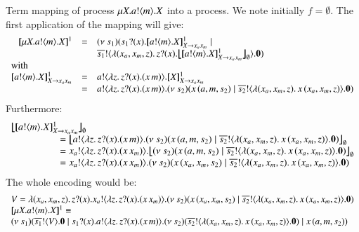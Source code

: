 \begin{example}

 Term mapping of \HOp process $\mu X. a ! \langle m \rangle . X$
into a \HO process. We note initially $f = \emptyset$. The first application of the mapping
will give:
%
\[
\begin{array}{rcl}
	\pmapp{\recp{X}{\bout{a}{m} \varp{X}}}{1}{} &=&
	\newsp{s_1}{ \binp{s_1}{x} \pmapp{\bout{a}{m} \varp{X}}{1}{\varp{X} \rightarrow x_ax_m} \Par\\
	&&\bout{\dual{s_1}}{ \abs{(x_a, x_m, z)} \binp{z}{x} \auxmap{\pmapp{\bout{a}{m} \varp{X}}{1}{\varp{X} \rightarrow x_ax_m}}{\es} } \inact}
	\\
	\multicolumn{3}{l}{\textrm{with}}
	\\
	\pmapp{\bout{a}{m} \varp{X}}{1}{ \varp{X} \rightarrow x_ax_m} &=&
	\bout{a}{\abs{z}{\binp{z}{x} (\appl{x}{m})}} \pmapp{\varp{X}}{1}{\varp{X} \rightarrow x_ax_m}
	\\
	&=& \bout{a}{\abs{z}{\binp{z}{x} (\appl{x}{m})}} \newsp{s_2}{\appl{x}{(a,m, s_2)}  \Par \bout{\dual{s_2}}{\abs{(x_a, x_m, z)}{\appl{x}{(x_a, x_m, z)}}} \inact}
\end{array}
\]
%
\noi Furthermore:
%
\[
\begin{array}{l}
	\auxmap{\pmapp{\bout{a}{m} \varp{X}}{1}{\varp{X} \rightarrow x_ax_m}}{\es}\\
	\qquad \qquad \quad = \auxmap{\bout{a}{\abs{z}{\binp{z}{x} (\appl{x}{m})}} \newsp{s_2}{\appl{x}{(a,m, s_2)}  \Par \bout{\dual{s_2}}{\abs{(x_a, x_m, z)}{\appl{x}{(x_a, x_m, z)}}} \inact}}{\es}
	\\
	\qquad \qquad \quad = \bout{x_a}{\abs{z}{\binp{z}{x} (\appl{x}{x_m})}} \auxmap{\newsp{s_2}{\appl{x}{(a,m, s_2)}  \Par \bout{\dual{s_2}}{\abs{(x_a, x_m, z)}{\appl{x}{(x_a, x_m, z)}}} \inact}}{\es}
	\\
	\qquad \qquad \quad = \bout{x_a}{\abs{z}{\binp{z}{x} (\appl{x}{x_m})}} \newsp{s_2}{\appl{x}{(x_a,x_m, s_2)}  \Par \bout{\dual{s_2}}{\abs{(x_a, x_m, z)}{\appl{x}{(x_a, x_m, z)}}} \inact}
\end{array}
\]
%
\noi The whole encoding would be:
%
\[
\begin{array}{l}
	V = \abs{(x_a, x_m, z)} \binp{z}{x} \bout{x_a}{\abs{z}{\binp{z}{x} (\appl{x}{x_m})}} \newsp{s_2}{\appl{x}{(x_a,x_m, s_2)}  \Par \bout{\dual{s_2}}{\abs{(x_a, x_m, z)}{\appl{x}{(x_a, x_m, z)}}} \inact}\\
	\pmapp{\recp{X}{\bout{a}{m} \varp{X}}}{1}{} \scong \\
	\newsp{s_1}{\bout{\dual{s_1}}{V} \inact \Par \binp{s_1}{x} \bout{a}{\abs{z}{\binp{z}{x} (\appl{x}{m})}} \newsp{s_2}{\bout{\dual{s_2}}{\abs{(x_a, x_m, z)}{\appl{x}{(x_a, x_m, z)}}} \inact} \Par \appl{x}{(a,m, s_2)}}
\end{array}
\]


\end{example}
